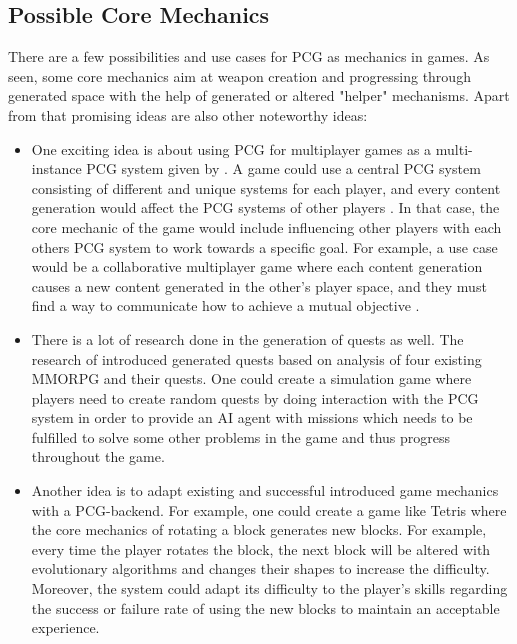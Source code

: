 \documentclass[MGS,Master,english]{twbook}%
\begin{document}
\subsection{Possible Core Mechanics}
There are a few possibilities and use cases for PCG as mechanics in games. As seen, some core mechanics aim at weapon creation and progressing through generated space with the help of generated or altered "helper" mechanisms. Apart from that promising ideas are also other noteworthy ideas:
\begin{itemize}
	\item One exciting idea is about using PCG for multiplayer games as a multi-instance PCG system given by \cite{pcg::futureOfPcgInGames}. A game could use a central PCG system consisting of different and unique systems for each player, and every content generation would affect the PCG systems of other players \cite{pcg::futureOfPcgInGames}.  In that case, the core mechanic of the game would include influencing other players with each others PCG system to work towards a specific goal. For example, a use case would be a collaborative multiplayer game where each content generation causes a new content generated in the other’s player space, and they must find a way to communicate how to achieve a mutual objective \cite{pcg::futureOfPcgInGames}. 
	\item There is a lot of research done in the generation of quests as well. The research of \cite{pcg::questGenerator} introduced generated quests based on analysis of four existing \ac{MMORPG} and their quests. One could create a simulation game where players need to create random quests by doing interaction with the PCG system in order to provide an AI agent with missions which needs to be fulfilled to solve some other problems in the game and thus progress throughout the game.
	\item Another idea is to adapt existing and successful introduced game mechanics with a PCG-backend. For example, one could create a game like Tetris where the core mechanics of rotating a block generates new blocks. For example, every time the player rotates the block, the next block will be altered with evolutionary algorithms and changes their shapes to increase the difficulty. Moreover, the system could adapt its difficulty to the player's skills regarding the success or failure rate of using the new blocks to maintain an acceptable experience.
\end{itemize} 

%
%
\clearpage
\end{document}
